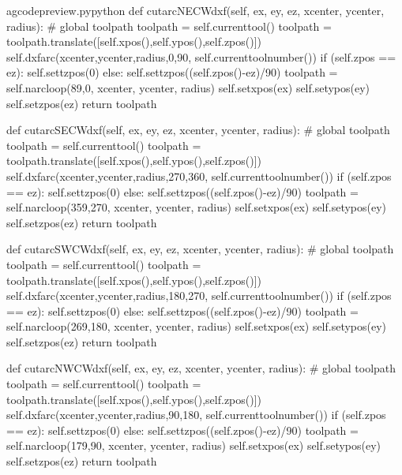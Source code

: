 \documentclass{ltxdoc}
\begin{document}
\begin{writecode}{a}{gcodepreview.py}{python}
    def cutarcNECWdxf(self, ex, ey, ez, xcenter, ycenter, radius):
#        global toolpath
        toolpath = self.currenttool()
        toolpath = toolpath.translate([self.xpos(),self.ypos(),self.zpos()])
        self.dxfarc(xcenter,ycenter,radius,0,90, self.currenttoolnumber())
        if (self.zpos == ez):
            self.settzpos(0)
        else:         
            self.settzpos((self.zpos()-ez)/90)
        toolpath = self.narcloop(89,0, xcenter, ycenter, radius)
        self.setxpos(ex)
        self.setypos(ey)
        self.setzpos(ez)
        return toolpath

    def cutarcSECWdxf(self, ex, ey, ez, xcenter, ycenter, radius):
#        global toolpath
        toolpath = self.currenttool()
        toolpath = toolpath.translate([self.xpos(),self.ypos(),self.zpos()])
        self.dxfarc(xcenter,ycenter,radius,270,360, self.currenttoolnumber())
        if (self.zpos == ez):
            self.settzpos(0)
        else:         
            self.settzpos((self.zpos()-ez)/90)
        toolpath = self.narcloop(359,270, xcenter, ycenter, radius)
        self.setxpos(ex)
        self.setypos(ey)
        self.setzpos(ez)
        return toolpath

    def cutarcSWCWdxf(self, ex, ey, ez, xcenter, ycenter, radius):
#        global toolpath
        toolpath = self.currenttool()
        toolpath = toolpath.translate([self.xpos(),self.ypos(),self.zpos()])
        self.dxfarc(xcenter,ycenter,radius,180,270, self.currenttoolnumber())
        if (self.zpos == ez):
            self.settzpos(0)
        else:         
            self.settzpos((self.zpos()-ez)/90)
        toolpath = self.narcloop(269,180, xcenter, ycenter, radius)
        self.setxpos(ex)
        self.setypos(ey)
        self.setzpos(ez)
        return toolpath

    def cutarcNWCWdxf(self, ex, ey, ez, xcenter, ycenter, radius):
#        global toolpath
        toolpath = self.currenttool()
        toolpath = toolpath.translate([self.xpos(),self.ypos(),self.zpos()])
        self.dxfarc(xcenter,ycenter,radius,90,180, self.currenttoolnumber())
        if (self.zpos == ez):
            self.settzpos(0)
        else:         
            self.settzpos((self.zpos()-ez)/90)
        toolpath = self.narcloop(179,90, xcenter, ycenter, radius)
        self.setxpos(ex)
        self.setypos(ey)
        self.setzpos(ez)
        return toolpath

\end{writecode}
\addtocounter{gcpy}{33}
\end{document}
